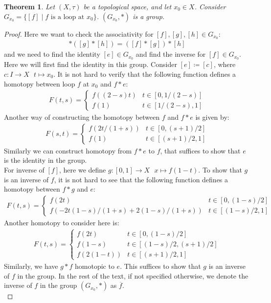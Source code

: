 \documentclass[11pt]{book}
\theoremstyle{break}
\theoremstyle{break}
\newtheorem{thm}{Theorem}[section]
\begin{document}
\begin{thm}
Let $(X,\tau)$ be a topological space, and let $x_0 \in X$. 
Consider $G_{x_0} = \{[f] \mid f\text{ is a loop at }x_0\}$. $(G_{x_0},*)$ is a group.
\end{thm}
\begin{proof}
Here we want to check the associativity for $[f], [g],[h]\in G_{x_0}$:
\begin{align*}
[f] *([g]*[h]) = ([f]*[g]) *[h]
\end{align*}
and we need to find the identity $[e]\in G_{x_0}$ and find the inverse for $[f]\in G_{x_0}$. Here we will first find the identity in this group. Consider $[e] \coloneqq [c]$, where $c:I \to X \ \ \ t\mapsto x_0$. It is not hard to verify that the following function defines a homotopy between loop $f$ at $x_0$ and $f*e$:
\begin{align*}
F(t,s) = \begin{cases}
f((2-s) t) & t \in [0,1/(2-s)] \\
f(1) & t \in [1/(2-s), 1]
\end{cases}
\end{align*} 
Another way of constructing the homotopy between $f$ and $f*e$ is given by:
\begin{align*}
F(s,t) = \begin{cases}
f(2t/(1+s)) & t \in [0,(s+1)/2]\\
f(1) & t\in [(s+1)/2, 1]
\end{cases}
\end{align*}
Similarly we can construct homotopy from $f*e$ to $f$, that suffices to show that $e$ is the identity in the group.\\ 

For inverse of $[f]$, here we define $g:[0,1]\to X \ \ \ x\mapsto f(1-t)$. To show that $g$ is an inverse of $f$, it is not hard to see that the following function defines a homotopy between $f*g$ and $e$:
\begin{align*}
F(t,s)  = \begin{cases}
f(2t) & t\in \left[0,(1-s)/2\right]\\
f\left(-2t(1-s)/(1+s) + 2(1-s)/(1+s) \right) & t \in [(1-s)/2, 1] \end{cases}
\end{align*}
Another homotopy to consider here is:
\begin{align*}
F(t,s) = \begin{cases}
f(2t) & t \in [0,(1-s)/2]\\
f(1-s) & t \in [(1-s)/2, (s+1)/2]\\
f(2(1-t)) & t \in [(s+1)/2, 1]
\end{cases}
\end{align*}
Similarly, we have $g*f$ homotopic to $e$. This suffices to show that $g$ is an inverse of $f$ in the group. In the rest of the text, if not specified otherwise, we denote the inverse of $f$ in the group $(G_{x_0}, *)$ as $\overline{f}$.\\


\end{proof}
\end{document}
